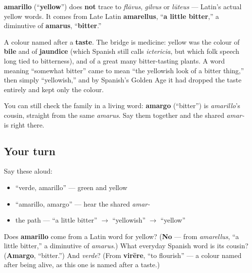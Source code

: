 \begin{cousinweb}
\textbf{amarillo} (\textquotedblleft{}\textbf{yellow}\textquotedblright{}) does \textbf{not} trace to \emph{flāvus}, \emph{gilvus} or \emph{lūteus} — Latin's actual yellow words. It comes from Late Latin \textbf{amarellus}, \textquotedblleft{}\textbf{a little bitter},\textquotedblright{} a diminutive of \textbf{amarus}, \textquotedblleft{}\textbf{bitter}.\textquotedblright{}

A colour named after a \textbf{taste}. The bridge is medicine: yellow was the colour of \textbf{bile} and of \textbf{jaundice} (which Spanish still calls \emph{ictericia}, but which folk speech long tied to bitterness), and of a great many bitter-tasting plants. A word meaning \textquotedblleft{}somewhat bitter\textquotedblright{} came to mean \textquotedblleft{}the yellowish look of a bitter thing,\textquotedblright{} then simply \textquotedblleft{}yellowish,\textquotedblright{} and by Spanish's Golden Age it had dropped the taste entirely and kept only the colour.

You can still check the family in a living word: \textbf{amargo} (\textquotedblleft{}bitter\textquotedblright{}) is \emph{amarillo}'s cousin, straight from the same \emph{amarus}. Say them together and the shared \emph{amar-} is right there.
\end{cousinweb}

\subsection*{Your turn}
Say these aloud:

\begin{itemize}
\raggedright
  \item \textquotedblleft{}verde, amarillo\textquotedblright{} — green and yellow
  \item \textquotedblleft{}amarillo, amargo\textquotedblright{} — hear the shared \emph{amar-}
  \item the path — \textquotedblleft{}a little bitter\textquotedblright{} $\to$ \textquotedblleft{}yellowish\textquotedblright{} $\to$ \textquotedblleft{}yellow\textquotedblright{}
\end{itemize}

\begin{tcolorbox}[breakable,colback=teal!4,colframe=teal!35!black,title={Before you move on}]
Does \textbf{amarillo} come from a Latin word for yellow? (\textbf{No} — from \emph{amarellus}, \textquotedblleft{}a little bitter,\textquotedblright{} a diminutive of \emph{amarus}.) What everyday Spanish word is its cousin? (\textbf{Amargo}, \textquotedblleft{}bitter.\textquotedblright{}) And \emph{verde}? (From \textbf{virēre}, \textquotedblleft{}to flourish\textquotedblright{} — a colour named after being alive, as this one is named after a taste.)
\end{tcolorbox}
